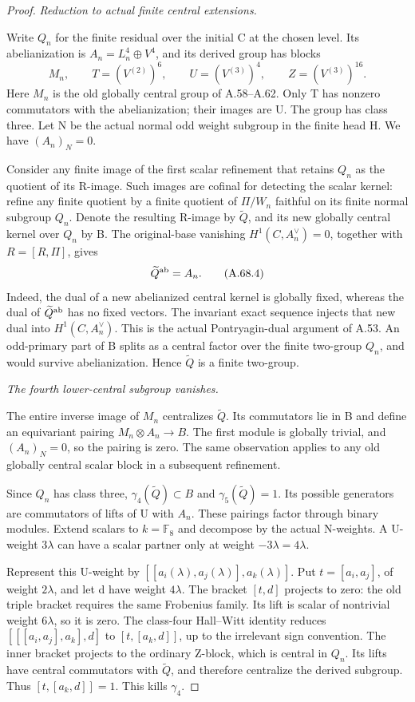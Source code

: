 \begin{proof}
\emph{Reduction to actual finite central extensions.}\par
Write \(Q_n\) for the finite residual over the initial C at the
chosen level. Its abelianization is
\(A_n=L_n^4\oplus V^4\), and its derived group has blocks
\[
 M_n,\qquad T=(V^{(2)})^6,\qquad
 U=(V^{(3)})^4,\qquad Z=(V^{(3)})^{16}.
 \tag{A.68.3}
\]
Here \(M_n\) is the old globally central group of A.58--A.62.
Only T has nonzero commutators with the abelianization; their
images are U. The group has class three. Let N be the actual
normal odd weight subgroup in the finite head H. We have
\((A_n)_N=0\).

Consider any finite image of the first scalar refinement that retains
\(Q_n\) as the quotient of its R-image. Such images are cofinal for
detecting the scalar kernel: refine any finite quotient by a finite
quotient of \(\Pi/W_n\) faithful on its finite normal subgroup
\(Q_n\). Denote the resulting R-image by \(\widetilde Q\),
and its new globally central kernel over \(Q_n\) by B.
The original-base vanishing \(H^1(C,A_n^\vee)=0\), together
with \(R=[R,\Pi]\), gives
\[
 \widetilde Q^{\rm ab}=A_n.
 \tag{A.68.4}
\]
Indeed, the dual of a new abelianized central kernel is globally
fixed, whereas the dual of \(\widetilde Q^{\rm ab}\) has no
fixed vectors. The invariant exact sequence injects that new dual
into \(H^1(C,A_n^\vee)\). This is the actual Pontryagin-dual
argument of A.53. An odd-primary part of B splits as a central
factor over the finite two-group \(Q_n\), and would survive
abelianization. Hence \(\widetilde Q\) is a finite two-group.

\emph{The fourth lower-central subgroup vanishes.}\par
The entire inverse image of \(M_n\) centralizes
\(\widetilde Q\). Its commutators lie in B and define an
equivariant pairing
\(M_n\otimes A_n\longrightarrow B\). The first module
is globally trivial, and \((A_n)_N=0\), so the pairing is zero.
The same observation applies to any old globally central scalar
block in a subsequent refinement.

Since \(Q_n\) has class three,
\(\gamma_4(\widetilde Q)\subset B\) and
\(\gamma_5(\widetilde Q)=1\). Its possible generators are
commutators of lifts of U with \(A_n\). These pairings factor
through binary modules. Extend scalars to \(k=\mathbb F_8\)
and decompose by the actual N-weights. A U-weight \(3\lambda\)
can have a scalar partner only at weight
\(-3\lambda=4\lambda\).

Represent this U-weight by
\([[a_i(\lambda),a_j(\lambda)],a_k(\lambda)]\).
Put \(t=[a_i,a_j]\), of weight \(2\lambda\), and let d
have weight \(4\lambda\). The bracket \([t,d]\) projects
to zero: the old triple bracket requires the same Frobenius
family. Its lift is scalar of nontrivial weight \(6\lambda\),
so it is zero. The class-four Hall--Witt identity reduces
\([
 [[a_i,a_j],a_k],d
]\) to \([t,[a_k,d]]\), up to the irrelevant sign convention.
The inner bracket projects to the ordinary Z-block, which is
central in \(Q_n\). Its lifts have central commutators with
\(\widetilde Q\), and therefore centralize the derived subgroup.
Thus \([t,[a_k,d]]=1\). This kills \(\gamma_4\).


\end{proof}
